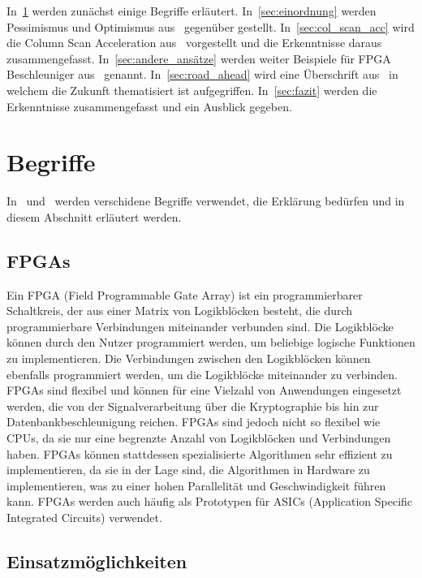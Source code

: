 \documentclass[conference]{IEEEtran}
\begin{document}
In~\ref{sec:begriffe} werden zunächst einige Begriffe erläutert. In~\ref{sec:einordnung} werden Pessimismus und Optimismus aus~\cite{istvan_glass_2019} gegenüber gestellt.
In~\ref{sec:col_scan_acc} wird die Column Scan Acceleration aus~\cite{lisa_column_2018} vorgestellt und die Erkenntnisse daraus zusammengefasst. In~\ref{sec:andere_ansätze}
werden weiter Beispiele für FPGA Beschleuniger aus~\cite{istvan_glass_2019} genannt. In~\ref{sec:road_ahead} wird eine Überschrift aus~\cite{istvan_glass_2019} in welchem die Zukunft thematisiert ist
aufgegriffen.
In~\ref{sec:fazit} werden die Erkenntnisse zusammengefasst und ein Ausblick gegeben.


\section{Begriffe} \label{sec:begriffe}
In~\cite{lisa_column_2018} und~\cite{istvan_glass_2019} werden verschidene Begriffe verwendet, die Erklärung bedürfen und in diesem Abschnitt
erläutert werden.


\subsection{FPGAs}
Ein FPGA (Field Programmable Gate Array) ist ein programmierbarer Schaltkreis, der aus einer Matrix von Logikblöcken besteht, die durch programmierbare Verbindungen miteinander verbunden sind.
Die Logikblöcke können durch den Nutzer programmiert werden, um beliebige logische Funktionen zu implementieren. Die Verbindungen zwischen den Logikblöcken können ebenfalls
programmiert werden, um die Logikblöcke miteinander zu verbinden. FPGAs sind flexibel und können für eine Vielzahl von Anwendungen eingesetzt werden, die von der Signalverarbeitung
über die Kryptographie bis hin zur Datenbankbeschleunigung reichen. FPGAs sind jedoch nicht so flexibel wie CPUs, da sie nur eine begrenzte Anzahl von Logikblöcken und Verbindungen
haben. FPGAs können stattdessen spezialisierte Algorithmen sehr effizient zu implementieren, da sie in der Lage sind, die Algorithmen in Hardware zu implementieren, was zu
einer hohen Parallelität und Geschwindigkeit führen kann. FPGAs werden auch häufig als Prototypen für ASICs (Application Specific Integrated Circuits) verwendet.

\subsection{Einsatzmöglichkeiten}
\end{document}
